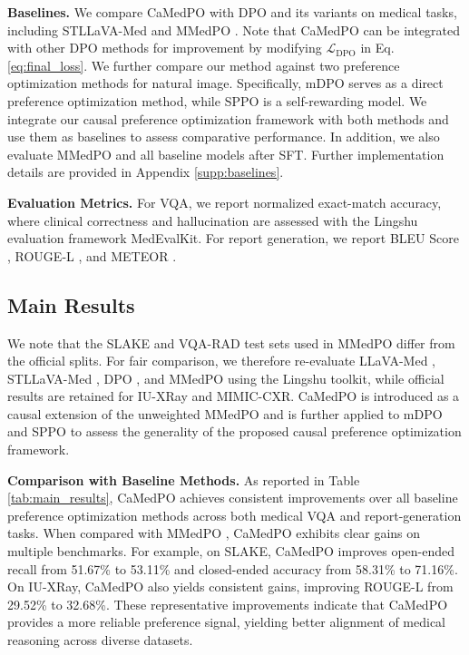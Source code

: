 \noindent\textbf{Baselines.}
We compare CaMedPO with DPO \cite{rafailov2023direct} and its variants on medical tasks, including STLLaVA-Med \cite{sun2024stllava} and MMedPO \cite{Zhu2025MMedPO}. Note that CaMedPO can be integrated with other DPO methods for improvement by modifying $\mathcal{L}_\text{DPO}$ in Eq. \ref{eq:final_loss}. We further compare our method against two preference optimization methods for natural image. Specifically, mDPO \cite{wang2024mdpo} serves as a direct preference optimization method, while SPPO \cite{wu2025selfplay} is a self-rewarding model. We integrate our causal preference optimization framework with both methods and use them as baselines to assess comparative performance. In addition, we also evaluate MMedPO and all baseline models after SFT. Further implementation details are provided in Appendix \ref{supp:baselines}.

\noindent\textbf{Evaluation Metrics.}
For VQA, we report normalized exact-match accuracy, where clinical correctness and hallucination are assessed with the Lingshu \cite{xu2025lingshu} evaluation framework MedEvalKit. For report generation, we report BLEU Score \cite{papineni2002bleu}, ROUGE-L \cite{papineni2002bleu}, and METEOR \cite{banerjee2005meteor}. 



\subsection{Main Results}






We note that the SLAKE and VQA-RAD test sets used in MMedPO differ from the official splits. For fair comparison, we therefore re-evaluate LLaVA-Med \cite{Li2023LLaVAMed}, STLLaVA-Med \cite{sun2024stllava}, DPO \cite{rafailov2023direct}, and MMedPO \cite{Zhu2025MMedPO} using the Lingshu toolkit, while official results are retained for IU-XRay and MIMIC-CXR.
CaMedPO is introduced as a causal extension of the unweighted MMedPO and is further applied to mDPO \cite{wang2024mdpo} and SPPO \cite{wu2025selfplay} to assess the generality of the proposed causal preference optimization framework.




\noindent\textbf{Comparison with Baseline Methods.}
As reported in Table \ref{tab:main_results}, CaMedPO achieves consistent improvements over all baseline preference optimization methods across both medical VQA and report-generation tasks. When compared with MMedPO \cite{Zhu2025MMedPO}, CaMedPO exhibits clear gains on multiple benchmarks. For example, on SLAKE, CaMedPO improves open-ended recall from 51.67\% to 53.11\% and closed-ended accuracy from 58.31\% to 71.16\%. On IU-XRay, CaMedPO also yields consistent gains, improving ROUGE-L from 29.52\% to 32.68\%. These representative improvements indicate that CaMedPO provides a more reliable preference signal, yielding better alignment of medical reasoning across diverse datasets.

